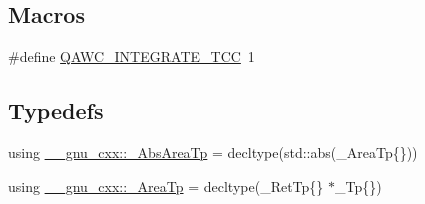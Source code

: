 \subsection*{Macros}
\begin{DoxyCompactItemize}
\item 
\#define \hyperlink{qawc__integrate_8tcc_a63243fdc5c0aac7ff9c666423211b628}{Q\+A\+W\+C\+\_\+\+I\+N\+T\+E\+G\+R\+A\+T\+E\+\_\+\+T\+CC}~1
\end{DoxyCompactItemize}
\subsection*{Typedefs}
\begin{DoxyCompactItemize}
\item 
using \hyperlink{namespace____gnu__cxx_a2f005089fd7e29a63d4165c56a5f4235}{\+\_\+\+\_\+gnu\+\_\+cxx\+::\+\_\+\+Abs\+Area\+Tp} = decltype(std\+::abs(\+\_\+\+Area\+Tp\{\}))
\item 
using \hyperlink{namespace____gnu__cxx_ae97a51b75e19c30f48d27fac4664de6e}{\+\_\+\+\_\+gnu\+\_\+cxx\+::\+\_\+\+Area\+Tp} = decltype(\+\_\+\+Ret\+Tp\{\} $\ast$\+\_\+\+Tp\{\})
\end{DoxyCompactItemize}
